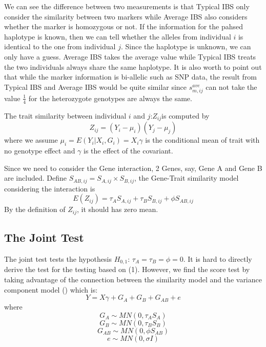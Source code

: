 \documentclass{article}
\begin{document}
         We can see the difference between two measurements is that Typical IBS only consider the similarity between two markers while Average IBS also considers whether the marker is homozygous or not. If the information for the pahsed haplotype is known,  then we can tell whether the alleles from individual $i$ is identical to the one from individual $j$. Since the haplotype is unknown, we can only have a guess. Average IBS takes the average value while Typical IBS treats the two individuals always share the same haplotype. It is also worth to point out that while the marker information is bi-allelic such as SNP data, the result from Typical IBS and Average IBS would be quite similar since $s^{ave}_{m,ij}$ can not take the value $\frac{1}{4}$ for the heterozygote genotypes are always the same.

         The trait similarity between individual $i$ and $j$:$Z_{ij}$is computed by
         \begin{equation*}
            Z_{ij}=(Y_i-\mu_i)(Y_j-\mu_j)
         \end{equation*}
         where we assume $\mu_i=E(Y_i|X_i,G_i)=X_i\gamma$ is the conditional mean of trait with no genotype effect and $\gamma$ is the effect of the covariant.

         Since we need to consider the Gene interaction, 2 Genes, say, Gene A and Gene B are included. Define $S_{AB,ij}=S_{A,ij}\times S_{B,ij}$, the Gene-Trait similarity model considering the interaction is
         \begin{equation}
            E(Z_{ij})=\tau_AS_{A,ij}+\tau_BS_{B,ij}+\phi S_{AB,ij}
         \end{equation}
        By the definition of $Z_{ij}$, it should has zero mean.

        \subsection{The Joint Test}
        The joint test tests the hypothesis $H_{0,1}$: $\tau_A=\tau_B=\phi=0$. It is hard to directly derive the test for the testing based on (1). However, we find the score test by taking advantage of the connection between the similarity model and the variance component model (\cite{Tzeng2009}) which is:
        \begin{equation}
            Y=X\gamma+G_A+G_B+G_{AB}+e
        \end{equation}
        where
        \[G_A   \sim   MN(0, \tau_AS_A)\]
        \[G_B   \sim   MN(0, \tau_BS_B)\]
        \[G_{AB}\sim   MN(0, \phi S_{AB})\]
        \[e     \sim   MN(0,\sigma I)\]
\end{document}
